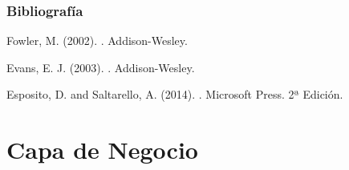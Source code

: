 \documentclass[handout,a4paper,slidestop,xcolor=pst,blue]{beamer}
\begin{document}
\begin{frame}[c]
    \frametitle{Bibliografía}
    \begin{thebibliography}{1}

        Fowler, M. (2002).
        .
        \newblock Addison-Wesley.

        Evans, E. J. (2003).
        .
        \newblock Addison-Wesley.

        Esposito, D. and Saltarello, A. (2014).
        . 
        \newblock Microsoft Press. 2ª Edición.

    \end{thebibliography}
\end{frame}

\section{Capa de Negocio}
\end{document}
